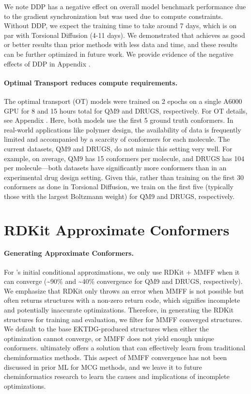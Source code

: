 We note DDP has a negative effect on overall model benchmark performance due to the gradient synchronization but was used due to compute constraints. Without DDP, we expect the training time to take around 7 days, which is on par with Torsional Diffusion (4-11 days). 
We demonstrated that \model achieves as good or better results than prior methods with less data and time, and these results can be further optimized in future work. We provide evidence of the negative effects of DDP in Appendix .

\paragraph{Optimal Transport reduces compute requirements.} The optimal transport (OT) models were trained on 2 epochs on a single A6000 GPU for 8 and 15 hours total for QM9 and DRUGS, respectively. For OT details, see Appendix . Here, both models use the first 5 ground truth conformers.
In real-world applications like polymer design, the availability of data is frequently limited and accompanied by a scarcity of conformers for each molecule. The current datasets, QM9 and DRUGS, do not mimic this setting very well. For example, on average, QM9 has 15 conformers per molecule, and DRUGS has 104 per molecule---both datasets have significantly more conformers than in an experimental drug design setting. Given this, rather than training on the first 30 conformers as done in Torsional Diffusion, we train on the first five (typically those with the largest Boltzmann weight) for QM9 and DRUGS, respectively. 

\section{RDKit Approximate Conformers}
\label{section:mmff}
\paragraph{Generating Approximate Conformers.} For \modelns's initial conditional approximations, we only use RDKit + MMFF when it can converge (\textasciitilde{90\%} and \textasciitilde{40\%} convergence for QM9 and DRUGS, respectively). We emphasize that RDKit only throws an error when MMFF is not possible but often returns structures with a non-zero return code, which signifies incomplete and potentially inaccurate optimizations. Therefore, in generating the RDKit structures for training and evaluation, we filter for MMFF converged structures. We default to the base EKTDG-produced structures when either the optimization cannot converge, or MMFF does not yield enough unique conformers. \model ultimately offers a solution that can effectively learn from traditional cheminformatics methods. This aspect of MMFF convergence has not been discussed in prior ML for MCG methods, and we leave it to future cheminformatics research to learn the causes and implications of incomplete optimizations.

